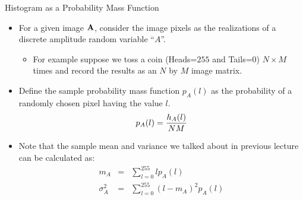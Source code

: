 %
%
\begin{slide}{Histogram as a Probability Mass Function}
\begin{itemize}
\small
\item For a given image ${\bf A}$,
consider the image pixels as the realizations of
a discrete amplitude random variable ``$A$''.
\begin{itemize}\scriptsize
\item For example suppose we toss a coin {(Heads=$255$ and Tails=$0$)}
$N\times M$ times and record the results as an $N$ by $M$ image matrix.
\end{itemize}
\item Define the sample probability mass function $p_{A}(l)$
as the probability of a randomly chosen pixel having the value $l$.
\begin{eqnarray}
p_{A}(l)={h_A(l) \over NM}
\end{eqnarray}
\item Note that the sample mean and variance we talked about
in previous lecture can be calculated as:
\begin{eqnarray*}
m_A&=&\sum_{l=0}^{255} l p_A(l) \\
\sigma^2_A&=&\sum_{l=0}^{255} (l-m_A)^2 p_A(l)
\end{eqnarray*} 
\end{itemize}
\end{slide}

